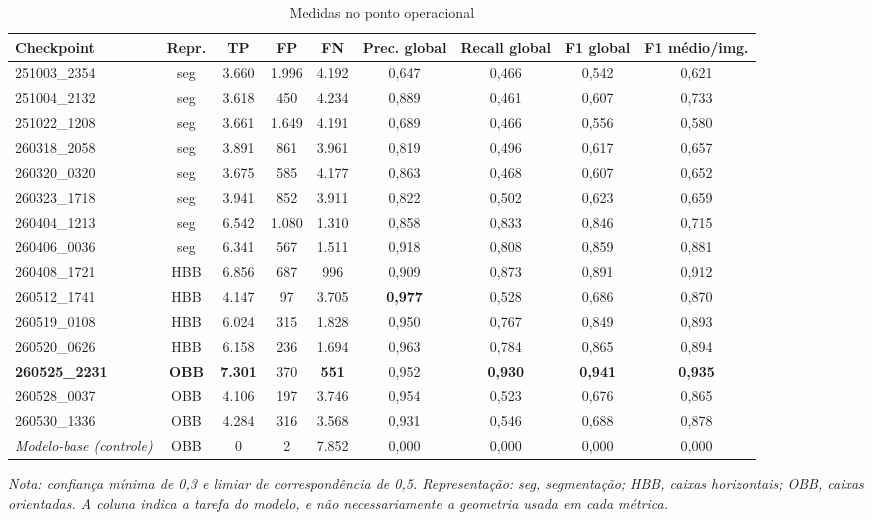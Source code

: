 \begin{table}[htb]
\centering
\caption{Medidas no ponto operacional}
\label{tab:medidas-ponto-operacional}
\scriptsize
\begin{tabular}{lcccccccc}
\hline
\textbf{Checkpoint} & \textbf{Repr.} & \textbf{TP} & \textbf{FP} & \textbf{FN} & \textbf{Prec. global} & \textbf{Recall global} & \textbf{F1 global} & \textbf{F1 m\'edio/img.} \\
\hline
251003\_2354 & seg & 3.660 & 1.996 & 4.192 & 0,647 & 0,466 & 0,542 & 0,621 \\
251004\_2132 & seg & 3.618 & 450 & 4.234 & 0,889 & 0,461 & 0,607 & 0,733 \\
251022\_1208 & seg & 3.661 & 1.649 & 4.191 & 0,689 & 0,466 & 0,556 & 0,580 \\
260318\_2058 & seg & 3.891 & 861 & 3.961 & 0,819 & 0,496 & 0,617 & 0,657 \\
260320\_0320 & seg & 3.675 & 585 & 4.177 & 0,863 & 0,468 & 0,607 & 0,652 \\
260323\_1718 & seg & 3.941 & 852 & 3.911 & 0,822 & 0,502 & 0,623 & 0,659 \\
260404\_1213 & seg & 6.542 & 1.080 & 1.310 & 0,858 & 0,833 & 0,846 & 0,715 \\
260406\_0036 & seg & 6.341 & 567 & 1.511 & 0,918 & 0,808 & 0,859 & 0,881 \\
260408\_1721 & HBB & 6.856 & 687 & 996 & 0,909 & 0,873 & 0,891 & 0,912 \\
260512\_1741 & HBB & 4.147 & 97 & 3.705 & \textbf{0,977} & 0,528 & 0,686 & 0,870 \\
260519\_0108 & HBB & 6.024 & 315 & 1.828 & 0,950 & 0,767 & 0,849 & 0,893 \\
260520\_0626 & HBB & 6.158 & 236 & 1.694 & 0,963 & 0,784 & 0,865 & 0,894 \\
\textbf{260525\_2231} & \textbf{OBB} & \textbf{7.301} & 370 & \textbf{551} & 0,952 & \textbf{0,930} & \textbf{0,941} & \textbf{0,935} \\
260528\_0037 & OBB & 4.106 & 197 & 3.746 & 0,954 & 0,523 & 0,676 & 0,865 \\
260530\_1336 & OBB & 4.284 & 316 & 3.568 & 0,931 & 0,546 & 0,688 & 0,878 \\
\textit{Modelo-base (controle)} & OBB & 0 & 2 & 7.852 & 0,000 & 0,000 & 0,000 & 0,000 \\
\hline
\end{tabular}

\vspace{0.3cm}
\footnotesize \textit{Nota: confian\c{c}a m\'inima de 0,3 e limiar de correspond\^encia de 0,5. Representa\c{c}\~ao: seg, segmenta\c{c}\~ao; HBB, caixas horizontais; OBB, caixas orientadas. A coluna indica a tarefa do modelo, e n\~ao necessariamente a geometria usada em cada m\'etrica.}
\end{table}

